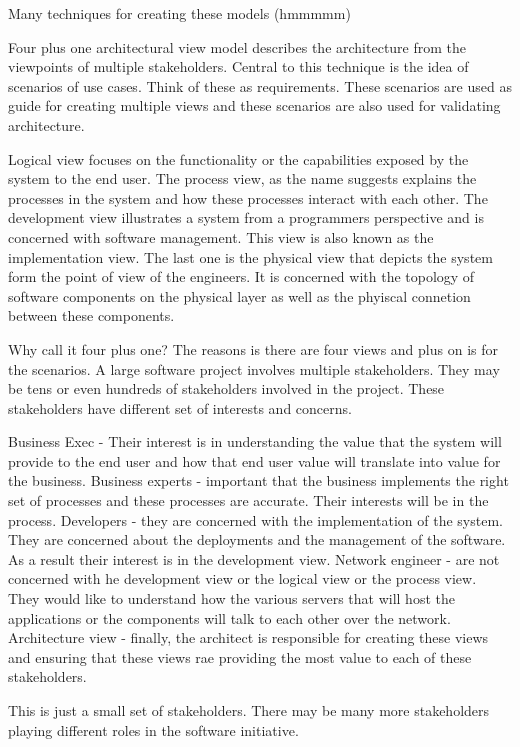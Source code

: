 Many techniques for creating these models (hmmmmm)

Four plus one architectural view model describes the architecture from the viewpoints of multiple stakeholders.
Central to this technique is the idea of scenarios of use cases. Think of these as requirements.
These scenarios are used as guide for creating multiple views and these scenarios are also used for validating architecture.

Logical view focuses on the functionality or the capabilities exposed by the system to the end user.
The process view, as the name suggests explains the processes in the system and how these processes interact with each other.
The development view illustrates a system from a programmers perspective and is concerned with software management. This view is also known as the implementation view.
The last one is the physical view that depicts the system form the point of view of the engineers.
It is concerned with the topology of software components on the physical layer as well as the phyiscal connetion between these components.


Why call it four plus one?
The reasons is there are four views and plus on is for the scenarios.
A large software project involves multiple stakeholders.
They may be tens or even hundreds of stakeholders involved in the project.
These stakeholders have different set of interests and concerns.

Business Exec - Their interest is in understanding the value that the system will provide to the end user and how that end user value will translate into value for the business.
Business experts - important that the business implements the right set of processes and these processes are accurate. Their interests will be in the process.
Developers - they are concerned with the implementation of the system.
They are concerned about the deployments and the management of the software.
As a result their interest is in the development view.
Network engineer - are not concerned with he development view or the logical view or the process view.
They would like to understand how the various servers that will host the applications or the components will talk to each other over the network.
Architecture view - finally, the architect is responsible for creating these views and ensuring that these views rae providing the most value to each of these stakeholders.

This is just a small set of stakeholders.
There may be many more stakeholders playing different roles in the software initiative.

